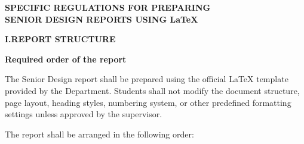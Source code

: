 
\clearpage
\thispagestyle{empty}

\begin{center}
    {\fontsize{16pt}{20pt}\selectfont\bfseries
    SPECIFIC REGULATIONS FOR PREPARING\\
    SENIOR DESIGN REPORTS USING \LaTeX}
\end{center}

\vspace{0.5cm}

{\fontsize{13pt}{17pt}\selectfont
{}
\justifying

\newcommand{\RegSection}[2]{%
    \par\vspace{0.45cm}\noindent
    {\fontsize{15pt}{19pt}\selectfont\bfseries #1.\quad #2}\par
    \vspace{0.12cm}}
\newcommand{\RegSubsection}[1]{%
    \par\vspace{0.18cm}\noindent
    {\fontsize{13pt}{17pt}\selectfont\bfseries #1}\par
    \vspace{0.06cm}}
\newcommand{\RegExample}{\textbf{Example.}\quad}


\RegSection{I}{REPORT STRUCTURE}

\RegSubsection{Required order of the report}

The Senior Design report shall be prepared using the official
\LaTeX{} template provided by the Department. Students shall not modify
the document structure, page layout, heading styles, numbering
system, or other predefined formatting settings unless approved by
the supervisor.

The report shall be arranged in the following order:

}
